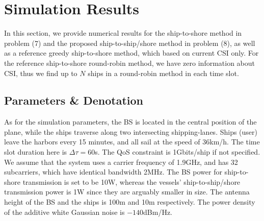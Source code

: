 \documentclass[conference]{IEEEtran}
\begin{document}
\section{Simulation Results}\label{sec:4}

In this section, we provide numerical results for the ship-to-shore method in problem (7) and the proposed ship-to-ship/shore method in problem (8), as well as a reference greedy ship-to-shore method, which based on current CSI only. 
For the reference ship-to-shore round-robin method, we have zero information about CSI, thus we find up to $N$ ships in a round-robin method in each time slot. 

\subsection{Parameters \& Denotation}




As for the simulation parameters, the BS is located in the central position of the plane, while the ships traverse along two intersecting shipping-lanes.
Ships (user) leave the harbors every 15 minutes, and all sail at the speed of 36km/h. The time slot duration here is $\Delta \tau = 60$s. The QoS constraint is 1Gbits/ship if not specified. We assume that the system uses a carrier frequency of 1.9GHz, and has 32 subcarriers, which have identical bandwidth 2MHz. The BS power for ship-to-shore transmission is set to be 10W, whereas the vessels' ship-to-ship/shore transmission power is 1W since they are arguably smaller in size. The antenna height of the BS and the ships is 100m and 10m respectively. The power density of the additive white Gaussian noise is ${-140}$dBm/Hz. 
\end{document}
